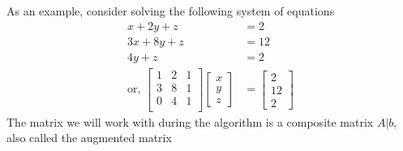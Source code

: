 \documentclass[../../linear_algebra.tex]{subfiles}
\begin{document}
As an example, consider solving the following system of equations
\begin{align*}
    x + 2y + z &= 2\\
    3x + 8y + z &= 12\\
    4y + z &= 2\\
    \text{or, } \begin{bmatrix}
    1 &2 &1\\
    3 &8 &1\\
    0 &4 &1\\
    \end{bmatrix}
    \begin{bmatrix}
        x\\y\\z
    \end{bmatrix} &= \begin{bmatrix}
        2\\12\\2
    \end{bmatrix}
\end{align*}
The matrix we will work with during the algorithm is a composite matrix $A \vert b$, also called the augmented matrix
\end{document}
